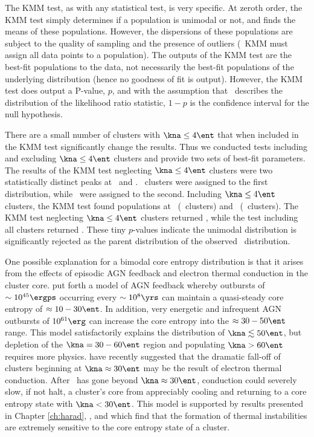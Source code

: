 The KMM test, as with any statistical test, is very specific. At
zeroth order, the KMM test simply determines if a population is
unimodal or not, and finds the means of these populations. However,
the dispersions of these populations are subject to the quality of
sampling and the presence of outliers (\eg\ KMM must assign all data
points to a population). The outputs of the KMM test are the best-fit
populations to the data, not necessarily the best-fit populations of
the underlying distribution (hence no goodness of fit is
output). However, the KMM test does output a P-value, $p$, and with
the assumption that \chisq\ describes the distribution of the
likelihood ratio statistic, $1-p$ is the confidence interval for the
null hypothesis.

There are a small number of clusters with $\kna \le 4 \ent$ that when
included in the KMM test significantly change the results. Thus we
conducted tests including and excluding $\kna \le 4 \ent$ clusters and
provide two sets of best-fit parameters. The results of the KMM test
neglecting $\kna \le 4 \ent$ clusters were two statistically distinct
peaks at \kmma\ and \kmmb. \kmmc\ clusters were assigned to the first
distribution, while \kmmd\ were assigned to the second. Including
$\kna \le 4 \ent$ clusters, the KMM test found populations at \kmmf\
(\kmmh\ clusters) and \kmmg\ (\kmmi\ clusters). The KMM test
neglecting $\kna \le 4 \ent$ clusters returned \kmme, while the test
including all clusters returned \kmmj. These tiny $p$-values indicate
the unimodal distribution is significantly rejected as the parent
distribution of the observed \kna\ distribution.

One possible explanation for a bimodal core entropy distribution is
that it arises from the effects of episodic AGN feedback and electron
thermal conduction in the cluster core. \citet{agnframework} put forth
a model of AGN feedback whereby outbursts of $\sim 10^{45} \ergps$
occurring every $\sim 10^8 \yrs$ can maintain a quasi-steady core
entropy of $\approx 10-30 \ent$. In addition, very energetic and
infrequent AGN outbursts of $10^{61} \erg$ can increase the core
entropy into the $\approx 30-50 \ent$ range. This model satisfactorily
explains the distribution of $\kna \lesssim 50 \ent$, but depletion of
the $\kna = 30-60 \ent$ region and populating $\kna > 60 \ent$
requires more physics. \citet{conduction} have recently suggested that
the dramatic fall-off of clusters beginning at $\kna \approx 30 \ent$
may be the result of electron thermal conduction. After \kna\ has gone
beyond $\kna \approx 30 \ent$, conduction could severely slow, if not
halt, a cluster's core from appreciably cooling and returning to a
core entropy state with $\kna < 30 \ent$. This model is supported by
results presented in Chapter \ref{ch:harad}, \citet{2008arXiv0804.3823G},
and \citet{2008arXiv0802.1864R} which find that the formation of
thermal instabilities are extremely sensitive to the core entropy
state of a cluster.

